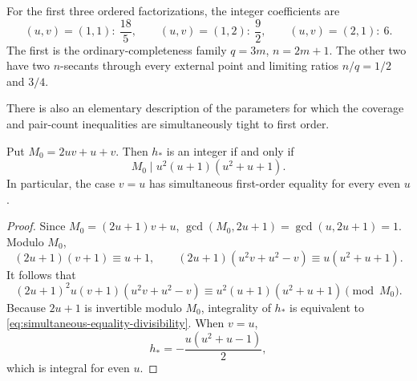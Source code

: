 For the first three ordered factorizations, the integer coefficients are
\begin{equation}\label{eq:first-integer-coefficients}
 (u,v)=(1,1):\ \frac{18}{5},\qquad
 (u,v)=(1,2):\ \frac92,\qquad
 (u,v)=(2,1):\ 6.
\end{equation}
The first is the ordinary-completeness family
\(q=3m\), \(n=2m+1\).  The other two have two \(n\)-secants through every
external point and limiting ratios \(n/q=1/2\) and \(3/4\).

There is also an elementary description of the parameters for which the
coverage and pair-count inequalities are simultaneously tight to first order.

\begin{proposition}
\label{prop:simultaneous-equality}
Put \(M_0=2uv+u+v\).  Then \(h_*\) is an integer if and only if
\begin{equation}\label{eq:simultaneous-equality-divisibility}
 M_0\mid u^2(u+1)(u^2+u+1).
\end{equation}
In particular, the case \(v=u\) has simultaneous first-order equality for
every even \(u\).
\end{proposition}

\begin{proof}
Since \(M_0=(2u+1)v+u\),
\(\gcd(M_0,2u+1)=\gcd(u,2u+1)=1\).  Modulo \(M_0\),
\[
 (2u+1)(v+1)\equiv u+1,
 \qquad
 (2u+1)(u^2v+u^2-v)\equiv u(u^2+u+1).
\]
It follows that
\[
 (2u+1)^2u(v+1)(u^2v+u^2-v)
 \equiv u^2(u+1)(u^2+u+1)\pmod{M_0}.
\]
Because \(2u+1\) is invertible modulo \(M_0\), integrality of \(h_*\) is
equivalent to
\eqref{eq:simultaneous-equality-divisibility}.  When \(v=u\),
\[
 h_*=-\frac{u(u^2+u-1)}2,
\]
which is integral for even \(u\).
\end{proof}
